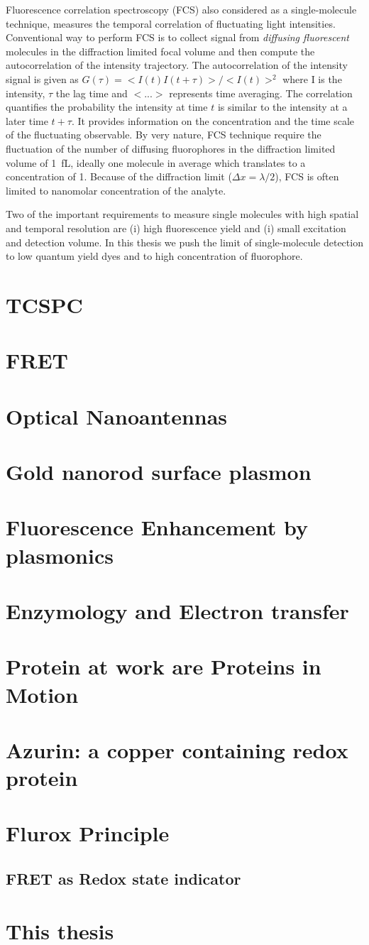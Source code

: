 Fluorescence correlation spectroscopy (FCS) also considered as a single-molecule technique, measures the temporal correlation of fluctuating light intensities.
Conventional way to perform FCS is to collect signal from \textit{diffusing fluorescent} molecules in the diffraction limited focal volume and then compute the autocorrelation of the intensity trajectory.
The autocorrelation of the intensity signal is given as $G(\tau)=<I(t)I(t+\tau)>/<I(t)>^2$ where I is the intensity, $\tau$ the lag time and $<...>$ represents time averaging.
The correlation quantifies the probability the intensity at time $t$ is similar to the intensity at a later time $t+\tau$.
It provides information on the concentration and the time scale of the fluctuating observable.
By very nature, FCS technique require the fluctuation of the number of diffusing fluorophores in the diffraction limited volume of \SI{1}{fL}, ideally one molecule in average which translates to a concentration of \SI{1}{\nM}.
Because of the diffraction limit ($\Delta{x}={\lambda}/2$), FCS is often limited to nanomolar concentration of the analyte. 

Two of the important requirements to measure single molecules with high spatial and temporal resolution are (i) high fluorescence yield and (i) small excitation and detection volume.
In this thesis we push the limit of single-molecule detection to low quantum yield dyes and to high concentration of fluorophore.
\section{TCSPC}

\section{FRET}
%
\section{Optical Nanoantennas}
\section{Gold nanorod surface plasmon}
\section{Fluorescence Enhancement by plasmonics}
%
\section{Enzymology and Electron transfer}
\section{Protein at work are Proteins in Motion}
\section{Azurin: a copper containing redox protein}
\section{Flurox Principle}
\subsection*{FRET as Redox state indicator}
%
\section{This thesis}
